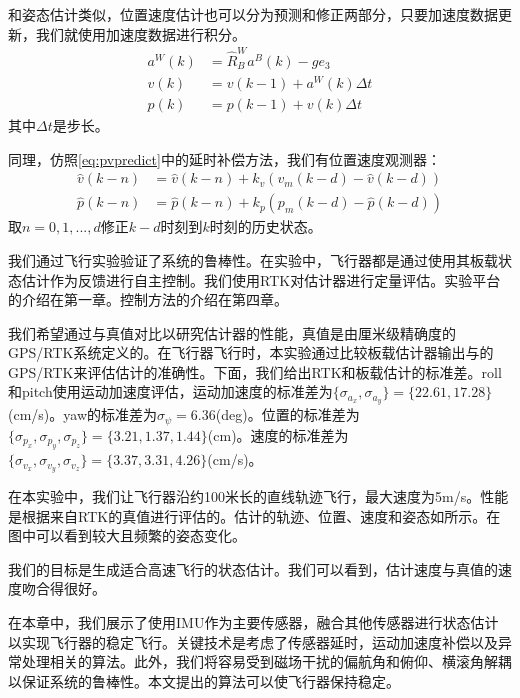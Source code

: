 \documentclass[
  type=master
]{gdutthesis}
\begin{document}
和姿态估计类似，位置速度估计也可以分为预测和修正两部分，只要加速度数据更新，我们就使用加速度数据进行积分。
\begin{equation}\label{eq:pvpredict}
	\begin{aligned}
		a^W(k) &= \hat{R}_B^W a^B(k) - g e_3\\
		v(k) &= v(k-1) + a^W(k) \Delta t\\
		p(k) &= p(k-1) + v(k) \Delta t
	\end{aligned}
\end{equation}
其中$\Delta t$是步长。

同理，仿照\autoref{eq:pvpredict}中的延时补偿方法，我们有位置速度观测器：
\begin{equation}\label{eq:mypvcorrection}
	\begin{aligned}
		\hat{v}(k-n) &= \hat{v}(k-n) + k_v (v_m(k-d) - \hat{v}(k-d))\\
		\hat{p}(k-n) &= \hat{p}(k-n) + k_p (p_m(k-d) - \hat{p}(k-d))
	\end{aligned}
\end{equation}
取$n=0,1,...,d$修正$k-d$时刻到$k$时刻的历史状态。

我们通过飞行实验验证了系统的鲁棒性。在实验中，飞行器都是通过使用其板载状态估计作为反馈进行自主控制。我们使用RTK对估计器进行定量评估。实验平台的介绍在第一章。控制方法的介绍在第四章。

我们希望通过与真值对比以研究估计器的性能，真值是由厘米级精确度的GPS/RTK系统定义的。在飞行器飞行时，本实验通过比较板载估计器输出与的GPS/RTK来评估估计的准确性。下面，我们给出RTK和板载估计的标准差。roll和pitch使用运动加速度评估，运动加速度的标准差为$\big\{ \sigma_{a_x},\sigma_{a_y} \big\}=\big\{ 22.61, 17.28 \big\}$(cm/s)。yaw的标准差为$\sigma_{\psi}=6.36$(deg)。位置的标准差为$\big\{ \sigma_{p_x},\sigma_{p_y},\sigma_{p_z} \big\}=\big\{ 3.21, 1.37, 1.44 \big\}$(cm)。速度的标准差为$\big\{ \sigma_{v_x},\sigma_{v_y},\sigma_{v_z} \big\}=\big\{ 3.37, 3.31, 4.26 \big\}$(cm/s)。

在本实验中，我们让飞行器沿约100米长的直线轨迹飞行，最大速度为5m/s。性能是根据来自RTK的真值进行评估的。估计的轨迹、位置、速度和姿态如所示。在图中可以看到较大且频繁的姿态变化。

我们的目标是生成适合高速飞行的状态估计。我们可以看到，估计速度与真值的速度吻合得很好。

在本章中，我们展示了使用IMU作为主要传感器，融合其他传感器进行状态估计以实现飞行器的稳定飞行。关键技术是考虑了传感器延时，运动加速度补偿以及异常处理相关的算法。此外，我们将容易受到磁场干扰的偏航角和俯仰、横滚角解耦以保证系统的鲁棒性。本文提出的算法可以使飞行器保持稳定。
\end{document}
